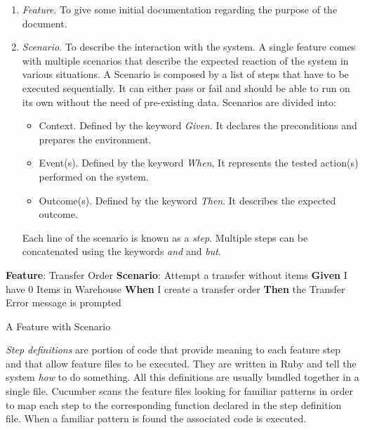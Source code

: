 \enlargethispage{-\baselineskip}

\begin{enumerate}
  \item \textit{Feature}. To give some initial documentation regarding the purpose of the document.
  \item \textit{Scenario}. To describe the interaction with the system. A single feature comes with multiple scenarios that describe the expected reaction of the system in various situations. A Scenario is composed by a list of steps that have to be executed sequentially. It can either pass or fail and should be able to run on its own without the need of pre-existing data. Scenarios are divided into:
  \begin{itemize}
    \item Context. Defined by the keyword \textit{Given}. It declares the preconditions and prepares the environment.
    \item Event(s). Defined by the keyword \textit{When}, It represents the tested action(s) performed on the system.
    \item Outcome(s). Defined by the keyword \textit{Then}. It describes the expected outcome.
  \end{itemize}
  
  Each line of the scenario is known as a \textit{step}. Multiple steps can be concatenated using the keywords \textit{and} and \textit{but}.
\end{enumerate}

\begin{algorithm}[ht]
\textbf{Feature}: Transfer Order\;
    \hspace{5mm} \textbf{Scenario}: Attempt a transfer without items\;
        \hspace{10mm} \textbf{Given} I have 0 Items in Warehouse\;
        \hspace{10mm} \textbf{When} I create a transfer order\;
        \hspace{10mm} \textbf{Then} the Transfer Error message is prompted\;
\caption{A Feature with Scenario}
\label{alg:featureWithScenario}
\end{algorithm}

\textit{Step definitions} are portion of code that provide meaning to each feature step and that allow feature files to be executed. They are written in Ruby and tell the system \textit{how} to do something. All this definitions are usually bundled together in a single file. Cucumber scans the feature files looking for familiar patterns in order to map each step to the corresponding function declared in the step definition file. When a familiar pattern is found the associated code is executed. 
